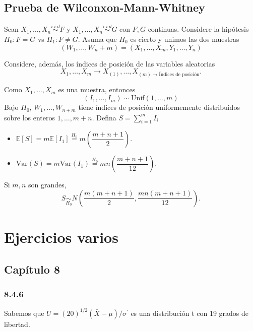 \documentclass[
  12pt,
]{book}
\begin{document}
\hypertarget{prueba-de-wilconxon-mann-whitney}{%
\section{Prueba de Wilconxon-Mann-Whitney}\label{prueba-de-wilconxon-mann-whitney}}

Sean \(X_1,\dots,X_n\overset{i.i.d}{\sim} F\) y \(X_1,\dots,X_n\overset{i.i.d}{\sim} G\) con \(F,G\) continuas. Considere la hipótesis
\(H_0: F = G\) vs \(H_1: F\neq G\).
Asuma que \(H_0\) es cierto y unimos las dos muestras
\[(W_1,\dots,W_n+m) = (X_1,\dots,X_m,Y_1,\dots,Y_n)\]

Considere, además, los índices de posición de las variables aleatorias
\[X_1,\dots,X_m \rightarrow X_{(1)},\dots,X_{(m)\to \text{Índices de posición}}.\]

Como \(X_1,\dots,X_m\) es una muestra, entonces
\[(I_1,\dots,I_m) \sim \text{Unif}(1,\dots,m)\]
Bajo \(H_0\), \(W_1,\dots,W_{n+m}\) tiene índices de posición uniformemente distribuidos sobre los enteros \(1,\dots,m+n\). Defina \(S = \sum_{i=1}^m I_i\)

\begin{itemize}
\item
  \(\mathbb E[S] = m\mathbb E[I_1] \overset{H_0}{=} m\left(\dfrac{m+n+1}{2}\right)\).
\item
  \(\text{Var}(S) = m\text{Var}(I_1) \overset{H_0}{=} mn\left(\dfrac{m+n+1}{12}\right)\).
\end{itemize}

Si \(m,n\) son grandes,
\[S\underset{H_0}{\sim}N\left(\dfrac{m(m+n+1)}{2},\dfrac{mn(m+n+1)}{12}\right).\]

\hypertarget{ejercicios-varios}{%
\chapter{Ejercicios varios}\label{ejercicios-varios}}

\hypertarget{capuxedtulo-8}{%
\section{Capítulo 8}\label{capuxedtulo-8}}

\hypertarget{section}{%
\subsection{8.4.6}\label{section}}

Sabemos que \(U = (20)^{1/2} (\bar{X}-\mu)/\sigma^\prime\) es una distribución t con 19 grados de libertad.
\end{document}
